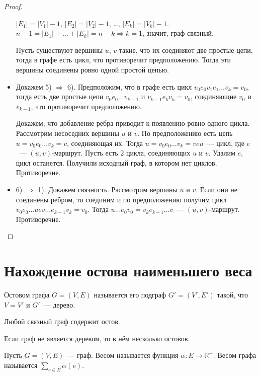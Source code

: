 \begin{theorem}
\begin{proof}
\begin{itemize}
	$|E_1| = |V_1| - 1$, $|E_2| = |V_2| - 1$, \ldots, $|E_k| = |V_k| - 1$. $n - 1 = |E_1| + \ldots + |E_k| = n - k \Rightarrow k = 1$, значит, граф связный.
	
	Пусть существуют вершины $u$, $v$ такие, что их соединяют две простые цепи, тогда в графе есть цикл, что противоречит предположению. Тогда эти вершины соединены ровно одной простой цепью.
	
	\item Докажем 5) $\Rightarrow$ 6). Предположим, что в графе есть цикл $v_0 e_0 v_1 e_1 \ldots v_k = v_0$, тогда есть две простые цепи $v_0 e_0 \ldots v_{k-1}$ и $v_{k-1} e_k v_k = v_0$, соединяющие $v_0$ и $v_{k-1}$, что противоречит предположению.
	
	Докажем, что добавление ребра приводит к появлению ровно одного цикла. Рассмотрим несоседних вершины $u$ и $v$. По предположению есть цепь $u = v_0 e_0 \ldots v_k = v$, соединяющая их. Тогда $u = v_0 e_0 \ldots v_k = v e u$~--- цикл, где $e$~--- $(u, v)$-маршрут. Пусть есть 2 цикла, соединяющих $u$ и $v$. Удалим $e$, цикл останется. Получили исходный граф, в котором нет циклов. Противоречие.
	
	\item 6) $\Rightarrow$ 1). Докажем связность. Рассмотрим вершины $u$ и $v$. Если они не соединены ребром, то соединим и по предположению получим цикл $v_0 e_0 \ldots u e v \ldots e_{k-1} v_k = v_0$. Тогда $u \ldots e_0 v_0 = v_k e_{k-1} \ldots v$~--- $(u, v)$-маршрут. Противоречие.
\end{itemize}
\end{proof}
\end{theorem}

\section{Нахождение остова наименьшего веса}
\begin{definition}
	Остовом графа $G = (V, E)$ называется его подграф $G' = (V', E')$ такой, что $V = V'$ и $G'$~--- дерево.
\end{definition}

\begin{statement}
	Любой связный граф содержит остов.
\end{statement}

\begin{statement}
	Если граф не является деревом, то в нём несколько остовов.
\end{statement}

\begin{definition}
	Пусть $G = (V, E)$~--- граф. Весом называется функция $\alpha \colon E \to \mathbb{R}^+$. Весом графа называется $\sum_{e \in E} \alpha(e)$.
\end{definition}